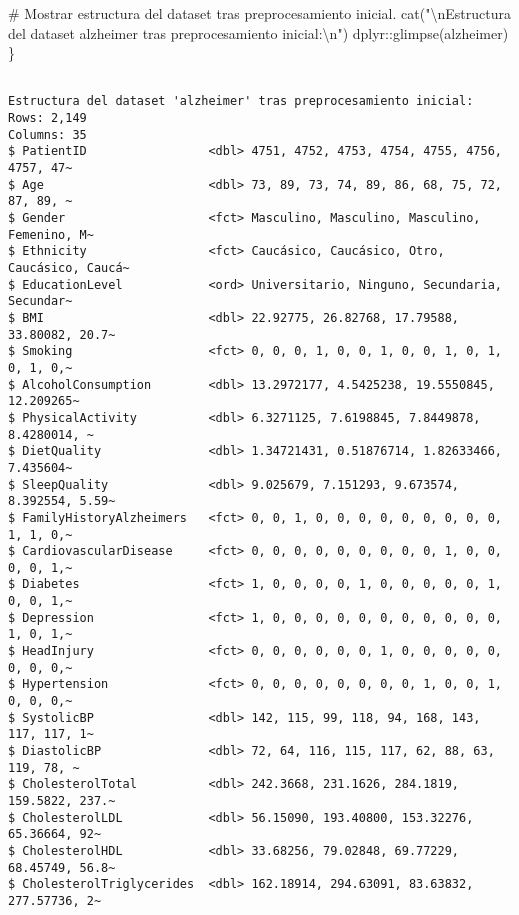 \documentclass[
  letterpaper,
  DIV=11,
  numbers=noendperiod]{scrartcl}
\newenvironment{Shaded}{\begin{snugshade}}{\end{snugshade}}
\newcommand{\CommentTok}[1]{\textcolor[rgb]{0.37,0.37,0.37}{#1}}
\newcommand{\FunctionTok}[1]{\textcolor[rgb]{0.28,0.35,0.67}{#1}}
\newcommand{\NormalTok}[1]{\textcolor[rgb]{0.00,0.23,0.31}{#1}}
\newcommand{\SpecialCharTok}[1]{\textcolor[rgb]{0.37,0.37,0.37}{#1}}
\newcommand{\StringTok}[1]{\textcolor[rgb]{0.13,0.47,0.30}{#1}}
\begin{document}
\begin{Shaded}
\begin{Highlighting}[]
\CommentTok{\# Mostrar estructura del dataset tras preprocesamiento inicial.}
\FunctionTok{cat}\NormalTok{(}\StringTok{"}\SpecialCharTok{\textbackslash{}n}\StringTok{Estructura del dataset \textquotesingle{}alzheimer\textquotesingle{} tras preprocesamiento inicial:}\SpecialCharTok{\textbackslash{}n}\StringTok{"}\NormalTok{)}
\NormalTok{dplyr}\SpecialCharTok{::}\FunctionTok{glimpse}\NormalTok{(alzheimer)}
\NormalTok{\}}
\end{Highlighting}
\end{Shaded}

\begin{verbatim}

Estructura del dataset 'alzheimer' tras preprocesamiento inicial:
Rows: 2,149
Columns: 35
$ PatientID                 <dbl> 4751, 4752, 4753, 4754, 4755, 4756, 4757, 47~
$ Age                       <dbl> 73, 89, 73, 74, 89, 86, 68, 75, 72, 87, 89, ~
$ Gender                    <fct> Masculino, Masculino, Masculino, Femenino, M~
$ Ethnicity                 <fct> Caucásico, Caucásico, Otro, Caucásico, Caucá~
$ EducationLevel            <ord> Universitario, Ninguno, Secundaria, Secundar~
$ BMI                       <dbl> 22.92775, 26.82768, 17.79588, 33.80082, 20.7~
$ Smoking                   <fct> 0, 0, 0, 1, 0, 0, 1, 0, 0, 1, 0, 1, 0, 1, 0,~
$ AlcoholConsumption        <dbl> 13.2972177, 4.5425238, 19.5550845, 12.209265~
$ PhysicalActivity          <dbl> 6.3271125, 7.6198845, 7.8449878, 8.4280014, ~
$ DietQuality               <dbl> 1.34721431, 0.51876714, 1.82633466, 7.435604~
$ SleepQuality              <dbl> 9.025679, 7.151293, 9.673574, 8.392554, 5.59~
$ FamilyHistoryAlzheimers   <fct> 0, 0, 1, 0, 0, 0, 0, 0, 0, 0, 0, 0, 1, 1, 0,~
$ CardiovascularDisease     <fct> 0, 0, 0, 0, 0, 0, 0, 0, 0, 1, 0, 0, 0, 0, 1,~
$ Diabetes                  <fct> 1, 0, 0, 0, 0, 1, 0, 0, 0, 0, 0, 1, 0, 0, 1,~
$ Depression                <fct> 1, 0, 0, 0, 0, 0, 0, 0, 0, 0, 0, 0, 1, 0, 1,~
$ HeadInjury                <fct> 0, 0, 0, 0, 0, 0, 1, 0, 0, 0, 0, 0, 0, 0, 0,~
$ Hypertension              <fct> 0, 0, 0, 0, 0, 0, 0, 0, 1, 0, 0, 1, 0, 0, 0,~
$ SystolicBP                <dbl> 142, 115, 99, 118, 94, 168, 143, 117, 117, 1~
$ DiastolicBP               <dbl> 72, 64, 116, 115, 117, 62, 88, 63, 119, 78, ~
$ CholesterolTotal          <dbl> 242.3668, 231.1626, 284.1819, 159.5822, 237.~
$ CholesterolLDL            <dbl> 56.15090, 193.40800, 153.32276, 65.36664, 92~
$ CholesterolHDL            <dbl> 33.68256, 79.02848, 69.77229, 68.45749, 56.8~
$ CholesterolTriglycerides  <dbl> 162.18914, 294.63091, 83.63832, 277.57736, 2~

\end{verbatim}
\end{document}
